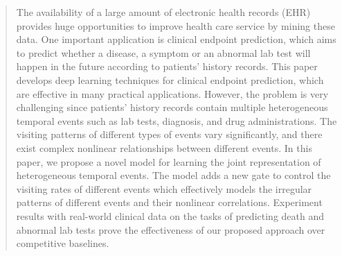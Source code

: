 \documentclass[letterpaper]{article} %
\begin{document}
\begin{abstract}
The availability of a large amount of electronic health records (EHR) provides huge opportunities to improve health care service by mining these data. One important application is clinical endpoint prediction, which aims to predict whether a disease, a symptom or an abnormal lab test will happen in the future according to patients' history records. This paper develops deep learning techniques for clinical endpoint prediction, which are  effective in many practical applications. However, the problem is very challenging since patients' history records contain multiple heterogeneous temporal events such as lab tests, diagnosis, and drug administrations. The visiting patterns of different types of events vary significantly, and there exist complex nonlinear relationships between different events. In this paper, we propose a novel model for learning the joint representation of heterogeneous temporal events. 
The  model adds a new gate to control the visiting rates of different events which effectively models the irregular patterns of different events and their nonlinear correlations. 
Experiment results with real-world clinical data on the tasks of predicting death and abnormal lab tests prove the effectiveness of our proposed approach over competitive baselines. 





\end{abstract}
\end{document}
